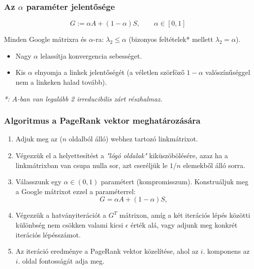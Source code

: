 \documentclass[]{beamer}
\begin{document}
\begin{frame}
	\frametitle{Az $\alpha$ paraméter jelentősége}
	
	\[ G := \alpha A + (1-\alpha) S, \qquad \alpha \in [0,1] \]
	
	Minden Google mátrixra és $\alpha$-ra: $\lambda_2 \leq \alpha$ (bizonyos feltételek* mellett $\lambda_2 = \alpha$).
	
	\begin{itemize}
		\item Nagy $\alpha$ lelassítja konvergencia sebességet.
		\item Kis $\alpha$ elnyomja a linkek jelentőségét (a véletlen szörföző $1-\alpha$ valószínűséggel nem a linkeken halad tovább).
	\end{itemize}
	
	\bigskip
	\textit{*: $A$-ban van legalább 2 irreducibilis zárt részhalmaz.}
\end{frame}

\begin{frame}
	\frametitle{Algoritmus a PageRank vektor meghatározására}
	\begin{enumerate}
		\item Adjuk meg az ($n$ oldalból álló) webhez tartozó linkmátrixot.
		
		\item Végezzük el a helyettesítést a \textit{"lógó oldalak"} kiküszöbölésére, azaz ha a linkmátrixban van csupa nulla sor, azt cseréljük le $1/n$ elemekből álló sorra.
		
		\item Válasszunk egy $\alpha \in (0,1)$ paramétert (kompromisszum). Konstruáljuk meg a Google mátrixot ezzel a paraméterrel:
		\[G = \alpha A + (1-\alpha)S,\]
		
		\item Végezzük a hatványiterációt a $G^T$ mátrixon, amíg a két iterációs lépés közötti különbség nem csökken valami kicsi $\epsilon$ érték alá, vagy adjunk meg konkrét iterációs lépésszámot.
		
		\item Az iteráció eredménye a PageRank vektor közelítése, ahol az $i.$ komponens az $i.$ oldal fontosságát adja meg.
	\end{enumerate}
\end{frame}
\end{document}
